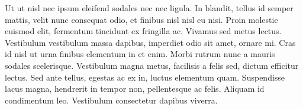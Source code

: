 {	Ut ut nisl nec ipsum eleifend sodales nec nec ligula. In blandit, tellus id semper mattis, velit nunc consequat odio, et finibus nisl nisl eu nisi. Proin molestie euismod elit, fermentum tincidunt ex fringilla ac. Vivamus sed metus lectus. Vestibulum vestibulum massa dapibus, imperdiet odio sit amet, ornare mi. Cras id nisl ut urna finibus elementum in et enim. Morbi rutrum nunc a mauris sodales scelerisque. Vestibulum magna metus, facilisis a felis sed, dictum efficitur lectus. Sed ante tellus, egestas ac ex in, luctus elementum quam. Suspendisse lacus magna, hendrerit in tempor non, pellentesque ac felis. Aliquam id condimentum leo. Vestibulum consectetur dapibus viverra. 
    }
    \vspace*{1\baselineskip}

